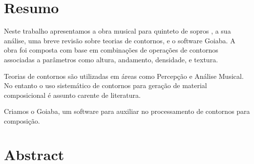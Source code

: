\chapter*{Resumo}
\label{cha:resumo}

Neste trabalho apresentamos a obra musical para quinteto de sopros
\obra{}, a sua análise, uma breve revisão sobre teorias de contornos,
e o software Goiaba. A obra foi composta com base em combinações de
operações de contornos associadas a parâmetros como altura, andamento,
densidade, e textura.

Teorias de contornos são utilizadas em áreas como Percepção e Análise
Musical. No entanto o uso sistemático de contornos para geração de
material composicional é assunto carente de literatura.

Criamos o Goiaba, um software para auxiliar no processamento de
contornos para composição.

\chapter*{Abstract}
\label{cha:abstract}
